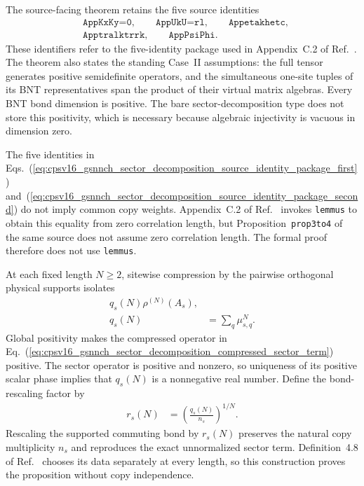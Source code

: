 \documentclass{article}
\begin{document}
The source-facing theorem retains the five source identities
\begin{align}
    &\texttt{AppKxKy=0},
    \qquad
    \texttt{AppUkU=rl},
    \qquad
    \texttt{Appetakhetc},
    \label{eq:cpsv16_gsnnch_sector_decomposition_source_identity_package_first}\\
    &\texttt{Apptralktrrk},
    \qquad
    \texttt{AppPsiPhi}.
    \label{eq:cpsv16_gsnnch_sector_decomposition_source_identity_package_second}
\end{align}
These identifiers refer to the five-identity package used in Appendix~C.2 of
Ref.~\cite{Cirac2016MPDO_arXiv}. The theorem also states the standing Case~II
assumptions: the full tensor generates positive semidefinite operators, and
the simultaneous one-site tuples of its BNT representatives span the product
of their virtual matrix algebras. Every BNT bond dimension is positive. The
bare sector-decomposition type does not store this positivity, which is
necessary because algebraic injectivity is vacuous in dimension zero.

The five identities in
Eqs.~(\ref{eq:cpsv16_gsnnch_sector_decomposition_source_identity_package_first})
and~(\ref{eq:cpsv16_gsnnch_sector_decomposition_source_identity_package_second})
do not imply common copy weights. Appendix~C.2 of
Ref.~\cite{Cirac2016MPDO_arXiv} invokes \texttt{lemmus} to obtain this equality
from zero correlation length, but Proposition~\texttt{prop3to4} of the same
source does not assume zero correlation length. The formal proof therefore
does not use \texttt{lemmus}.

At each fixed length $N\geq2$, sitewise compression by the pairwise orthogonal
physical supports isolates
\begin{align}
    q_s(N)\rho^{(N)}(A_s),
    \label{eq:cpsv16_gsnnch_sector_decomposition_compressed_sector_term}\\
    q_s(N)
        &=\sum_q\mu_{s,q}^N.
    \label{eq:cpsv16_gsnnch_sector_decomposition_sector_power_sum_coefficient}
\end{align}
Global positivity makes the compressed operator in
Eq.~(\ref{eq:cpsv16_gsnnch_sector_decomposition_compressed_sector_term})
positive. The sector operator is positive and nonzero, so uniqueness of its
positive scalar phase implies that $q_s(N)$ is a nonnegative real number.
Define the bond-rescaling factor by
\begin{align}
    r_s(N)
        &=\left(\frac{q_s(N)}{n_s}\right)^{1/N}.
    \label{eq:cpsv16_gsnnch_sector_decomposition_positive_root_bond_rescaling}
\end{align}
Rescaling the supported commuting bond by $r_s(N)$ preserves the natural copy
multiplicity $n_s$ and reproduces the exact unnormalized sector term.
Definition~4.8 of Ref.~\cite{Cirac2016MPDO_arXiv} chooses its data separately
at every length, so this construction proves the proposition without copy
independence.
\end{document}
